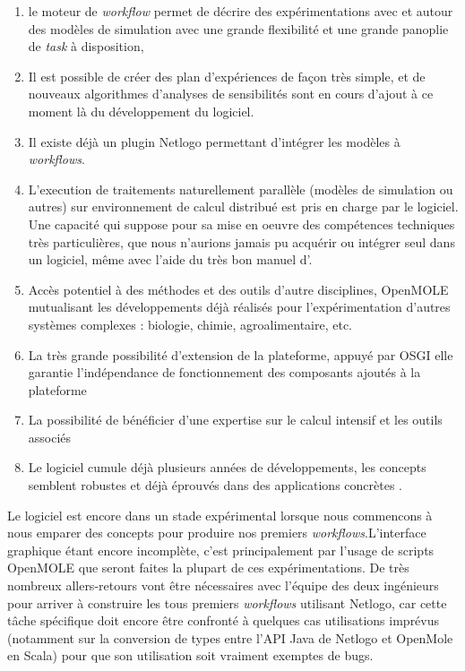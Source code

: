 \begin{enumerate}[label=(\alph*),labelindent=\parindent,leftmargin=*]
\item le moteur de \textit{workflow} permet de décrire des expérimentations avec et autour des modèles de simulation avec une grande flexibilité et une grande panoplie de \textit{task} à disposition,
\item Il est possible de créer des plan d'expériences de façon très simple, et de nouveaux algorithmes d'analyses de sensibilités sont en cours d'ajout à ce moment là du développement du logiciel.
\item Il existe déjà un plugin Netlogo permettant d'intégrer les modèles à \textit{workflows}.
\item L'execution de traitements naturellement parallèle (modèles de simulation ou autres) sur environnement de calcul distribué est pris en charge par le logiciel. Une capacité qui suppose pour sa mise en oeuvre des compétences techniques très particulières, que nous n'aurions jamais pu acquérir ou intégrer seul dans un logiciel, même avec l'aide du très bon manuel d'\textcite{Openshaw2000}.
\item Accès potentiel à des méthodes et des outils d'autre disciplines, OpenMOLE mutualisant les développements déjà réalisés pour l'expérimentation d'autres systèmes complexes : biologie, chimie, agroalimentaire, etc.
\item La très grande possibilité d'extension de la plateforme, appuyé par OSGI elle garantie l'indépendance de fonctionnement des composants ajoutés à la plateforme
\item La possibilité de bénéficier d'une expertise sur le calcul intensif et les outils associés
\item Le logiciel cumule déjà plusieurs années de développements, les concepts semblent robustes et déjà éprouvés dans des applications concrètes \autocite{Mesmoudi2010}.
\end{enumerate}

Le logiciel est encore dans un stade expérimental lorsque nous commencons à nous emparer des concepts pour produire nos premiers \textit{workflows}.L'interface graphique étant encore incomplète, c'est principalement par l'usage de scripts OpenMOLE que seront faites la plupart de ces expérimentations. De très nombreux allers-retours vont être nécessaires avec l'équipe des deux ingénieurs pour arriver à construire les tous premiers \textit{workflows} utilisant Netlogo, car cette tâche spécifique doit encore être confronté à quelques cas utilisations imprévus (notamment sur la conversion de types entre l'API Java de Netlogo et OpenMole en Scala) pour que son utilisation soit vraiment exemptes de bugs. 

